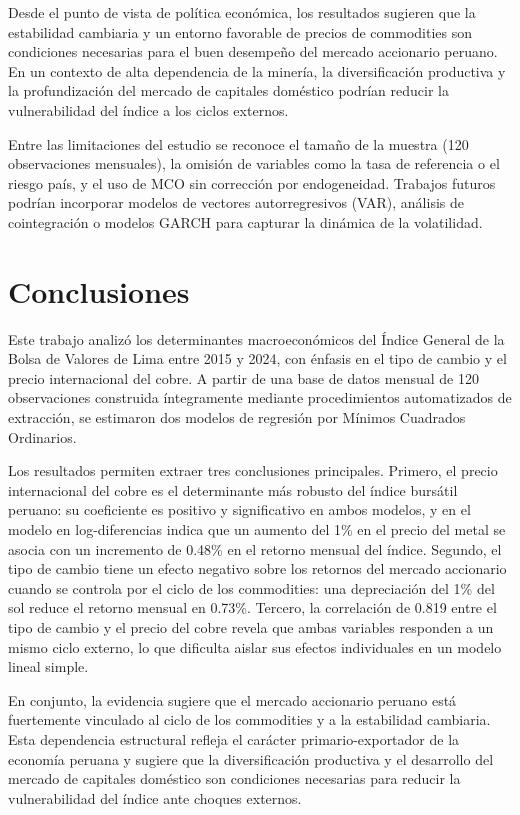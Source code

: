 \documentclass[12pt, a4paper]{article}
\begin{document}
Desde el punto de vista de política económica, los resultados sugieren que la estabilidad cambiaria y un entorno favorable de precios de commodities son condiciones necesarias para el buen desempeño del mercado accionario peruano. En un contexto de alta dependencia de la minería, la diversificación productiva y la profundización del mercado de capitales doméstico podrían reducir la vulnerabilidad del índice a los ciclos externos.

Entre las limitaciones del estudio se reconoce el tamaño de la muestra (120 observaciones mensuales), la omisión de variables como la tasa de referencia o el riesgo país, y el uso de MCO sin corrección por endogeneidad. Trabajos futuros podrían incorporar modelos de vectores autorregresivos (VAR), análisis de cointegración o modelos GARCH para capturar la dinámica de la volatilidad.

\section{Conclusiones}

Este trabajo analizó los determinantes macroeconómicos del Índice General de la Bolsa de Valores de Lima entre 2015 y 2024, con énfasis en el tipo de cambio y el precio internacional del cobre. A partir de una base de datos mensual de 120 observaciones construida íntegramente mediante procedimientos automatizados de extracción, se estimaron dos modelos de regresión por Mínimos Cuadrados Ordinarios.

Los resultados permiten extraer tres conclusiones principales. Primero, el precio internacional del cobre es el determinante más robusto del índice bursátil peruano: su coeficiente es positivo y significativo en ambos modelos, y en el modelo en log-diferencias indica que un aumento del 1\% en el precio del metal se asocia con un incremento de 0.48\% en el retorno mensual del índice. Segundo, el tipo de cambio tiene un efecto negativo sobre los retornos del mercado accionario cuando se controla por el ciclo de los commodities: una depreciación del 1\% del sol reduce el retorno mensual en 0.73\%. Tercero, la correlación de 0.819 entre el tipo de cambio y el precio del cobre revela que ambas variables responden a un mismo ciclo externo, lo que dificulta aislar sus efectos individuales en un modelo lineal simple.

En conjunto, la evidencia sugiere que el mercado accionario peruano está fuertemente vinculado al ciclo de los commodities y a la estabilidad cambiaria. Esta dependencia estructural refleja el carácter primario-exportador de la economía peruana y sugiere que la diversificación productiva y el desarrollo del mercado de capitales doméstico son condiciones necesarias para reducir la vulnerabilidad del índice ante choques externos.
\end{document}
